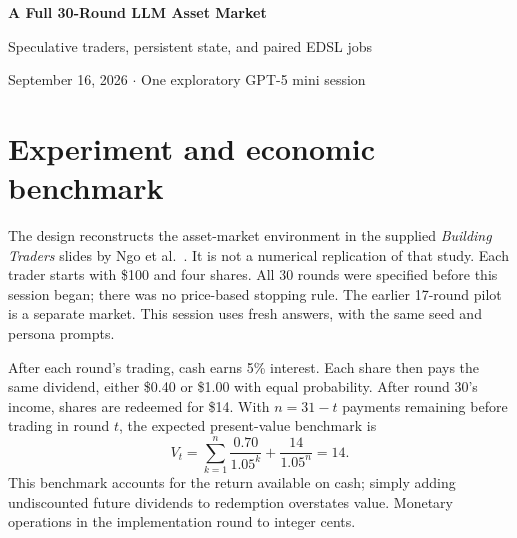 \documentclass[11pt,letterpaper]{article}
\begin{document}
\begin{center}
{\LARGE\bfseries\color{ink} A Full 30-Round LLM Asset Market}\par
\vspace{5pt}
{\large Speculative traders, persistent state, and paired EDSL jobs}\par
{\small September 16, 2026 \quad $\cdot$ \quad One exploratory GPT-5 mini session}
\end{center}

\begin{abstract}
Twelve LLM traders completed a 30-round asset market with a constant \$14
fundamental value. Trading began at \$23.75 in round 5 and reached \$31 in
rounds 26--28, a 121.4\% premium to fundamental value. The market traded 114
shares across 21 rounds. There were no transactions in the last two rounds;
all 48 outstanding shares were then redeemed for \$14 under the announced
contract. Thus the run displays sustained overpricing and a rising price path,
but no observed market-price crash. EDSL elicited 360 fresh decisions; native
shared-state commands executed 30 settlements. Paired agent/scenario jobs
reduced full-round inference time to 30.5 seconds on average. This report
includes the complete experiment code, the workflow executor, and the native
market implementation. Economic mistakes in some responses remain an
important limitation despite a successful execution audit.
\end{abstract}

\section{Experiment and economic benchmark}
The design reconstructs the asset-market environment in the supplied
\emph{Building Traders} slides by Ngo et al.\ \cite{ngo}. It is not a numerical
replication of that study. Each trader starts with \$100 and four shares.
All 30 rounds were specified before this session began; there was no
price-based stopping rule. The earlier 17-round pilot is a separate market.
This session uses fresh answers, with the same seed and persona prompts.

After each round's trading, cash earns 5\% interest. Each share then pays the
same dividend, either \$0.40 or \$1.00 with equal probability. After round 30's
income, shares are redeemed for \$14. With $n=31-t$ payments remaining before
trading in round $t$, the expected present-value benchmark is
\[
 V_t=\sum_{k=1}^{n}\frac{0.70}{1.05^k}+\frac{14}{1.05^n}=14.
\]
This benchmark accounts for the return available on cash; simply adding
undiscounted future dividends to redemption overstates value. Monetary
operations in the implementation round to integer cents.
\end{document}
